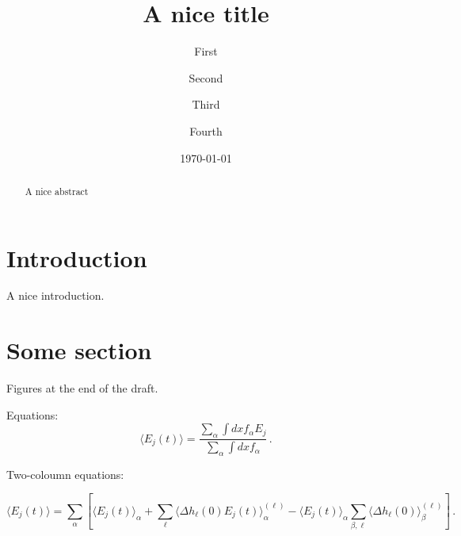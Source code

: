 \documentclass[aip,pop,reprint]{revtex4-1}
\begin{document}
\title{ A nice title}

\author{First}

\author{Second}

\author{Third} 
\author{Fourth} 

\date{\today}


\begin{abstract}
  A nice abstract
\end{abstract}


\maketitle 



\section{Introduction}

A nice introduction.

\section{Some section}
\label{sc:asd}

Figures at the end of the draft.

Equations:
\begin{equation}
  \langle E_j(t) \rangle = \frac{\sum_{\alpha} \int dx f_{\alpha}
  E_j}{\sum_{\alpha} \int dx f_{\alpha}} \,. \label{average}
\end{equation}
%

Two-coloumn equations:
\begin{widetext}
  \begin{equation}
    \label{promt}
    \langle E_j(t) \rangle = \sum_{\alpha} \left[ \langle
      E_j(t)\rangle_{\alpha} + \sum_\ell \langle \Delta h_\ell(0)
      E_j(t)\rangle_\alpha^{(\ell)} - \langle E_j(t) \rangle_{\alpha}
      \sum_{\beta,\ell} \langle \Delta h_\ell(0) \rangle_\beta^{(\ell)} \right]\,.
  \end{equation}
\end{widetext}
%
\end{document}
